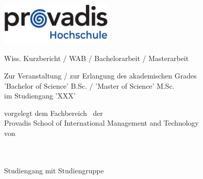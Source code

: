 %
%


\begin{titlepage}

    \includegraphics[height=2.06cm]{Bilder/Deckblatt/provadis-hochschule.pdf}
    \hfill

    \vspace*{1cm}

    \begin{singlespace}
        \begin{center}

            \normalsize
            Wiss. Kurzbericht / WAB / Bachelorarbeit / Masterarbeit

            \vspace*{2cm}

            \large

            \textbf{\titel}

            \vspace*{3cm}

            \normalsize
            Zur Veranstaltung / zur Erlangung des akademischen Grades\\
            ’Bachelor of Science’ B.Sc. / ’Master of Science’ M.Sc.\\
            im Studiengang ’XXX’

            \vspace*{2cm}

            vorgelegt dem Fachbereich \fakultaet \ der\\
            Provadis School of International Management and Technology\\
            von

            \vspace*{1cm}

            \fullname \\
            \matnr \\
            Studiengang mit Studiengruppe \\
            \email \\
            \telMobil


\end{center}
\end{singlespace}
\end{titlepage}
